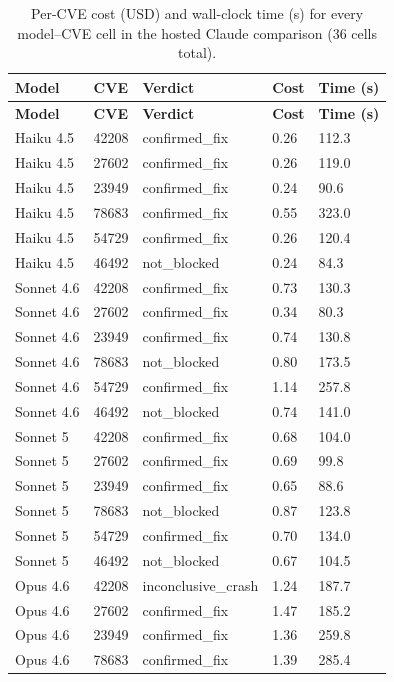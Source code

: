 \documentclass[12pt,a4paper]{report}
\begin{document}
\begin{longtable}{@{}p{2.2cm}p{1.3cm}p{3cm}p{1.5cm}p{1.5cm}@{}}
\caption{Per-CVE cost (USD) and wall-clock time (s) for every model--CVE cell in the hosted Claude comparison (36 cells total).}
\label{tab:claude-per-cve} \\
\toprule
\textbf{Model} & \textbf{CVE} & \textbf{Verdict} & \textbf{Cost} & \textbf{Time (s)} \\
\midrule
\endfirsthead
\toprule
\textbf{Model} & \textbf{CVE} & \textbf{Verdict} & \textbf{Cost} & \textbf{Time (s)} \\
\midrule
\endhead
\midrule
Haiku 4.5 & 42208 & confirmed\_fix & 0.26 & 112.3 \\
Haiku 4.5 & 27602 & confirmed\_fix & 0.26 & 119.0 \\
Haiku 4.5 & 23949 & confirmed\_fix & 0.24 & 90.6 \\
Haiku 4.5 & 78683 & confirmed\_fix & 0.55 & 323.0 \\
Haiku 4.5 & 54729 & confirmed\_fix & 0.26 & 120.4 \\
Haiku 4.5 & 46492 & not\_blocked & 0.24 & 84.3 \\
\midrule
Sonnet 4.6 & 42208 & confirmed\_fix & 0.73 & 130.3 \\
Sonnet 4.6 & 27602 & confirmed\_fix & 0.34 & 80.3 \\
Sonnet 4.6 & 23949 & confirmed\_fix & 0.74 & 130.8 \\
Sonnet 4.6 & 78683 & not\_blocked & 0.80 & 173.5 \\
Sonnet 4.6 & 54729 & confirmed\_fix & 1.14 & 257.8 \\
Sonnet 4.6 & 46492 & not\_blocked & 0.74 & 141.0 \\
\midrule
Sonnet 5 & 42208 & confirmed\_fix & 0.68 & 104.0 \\
Sonnet 5 & 27602 & confirmed\_fix & 0.69 & 99.8 \\
Sonnet 5 & 23949 & confirmed\_fix & 0.65 & 88.6 \\
Sonnet 5 & 78683 & not\_blocked & 0.87 & 123.8 \\
Sonnet 5 & 54729 & confirmed\_fix & 0.70 & 134.0 \\
Sonnet 5 & 46492 & not\_blocked & 0.67 & 104.5 \\
\midrule
Opus 4.6 & 42208 & inconclusive\_crash & 1.24 & 187.7 \\
Opus 4.6 & 27602 & confirmed\_fix & 1.47 & 185.2 \\
Opus 4.6 & 23949 & confirmed\_fix & 1.36 & 259.8 \\
Opus 4.6 & 78683 & confirmed\_fix & 1.39 & 285.4 \\

\end{longtable}
\end{document}
